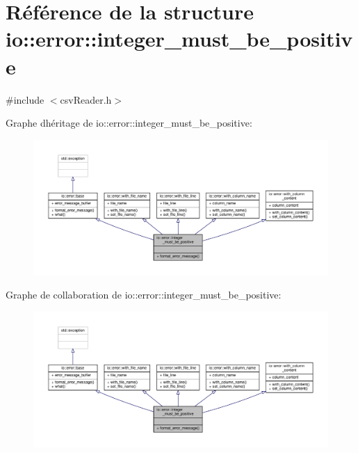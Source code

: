 \hypertarget{structio_1_1error_1_1integer__must__be__positive}{}\section{Référence de la structure io\+:\+:error\+:\+:integer\+\_\+must\+\_\+be\+\_\+positive}
\label{structio_1_1error_1_1integer__must__be__positive}


{\ttfamily \#include $<$csv\+Reader.\+h$>$}



Graphe d\textquotesingle{}héritage de io\+:\+:error\+:\+:integer\+\_\+must\+\_\+be\+\_\+positive\+:\nopagebreak
\begin{figure}[H]
\begin{center}
\leavevmode
\includegraphics[width=350pt]{structio_1_1error_1_1integer__must__be__positive__inherit__graph}
\end{center}
\end{figure}


Graphe de collaboration de io\+:\+:error\+:\+:integer\+\_\+must\+\_\+be\+\_\+positive\+:\nopagebreak
\begin{figure}[H]
\begin{center}
\leavevmode
\includegraphics[width=350pt]{structio_1_1error_1_1integer__must__be__positive__coll__graph}
\end{center}
\end{figure}
